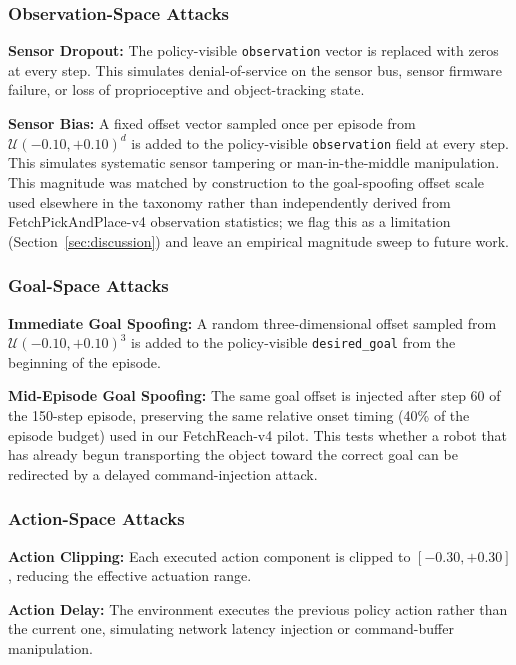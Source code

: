 \documentclass[conference]{IEEEtran}
\begin{document}
\subsubsection{Observation-Space Attacks}

\textbf{Sensor Dropout:} The policy-visible \texttt{observation} vector is replaced
with zeros at every step. This simulates denial-of-service on the sensor bus, sensor
firmware failure, or loss of proprioceptive and object-tracking state.

\textbf{Sensor Bias:} A fixed offset vector sampled once per episode from
$\mathcal{U}(-0.10,+0.10)^d$ is added to the policy-visible \texttt{observation}
field at every step. This simulates systematic sensor tampering or man-in-the-middle
manipulation. This magnitude was matched by construction to the goal-spoofing offset
scale used elsewhere in the taxonomy rather than independently derived from
FetchPickAndPlace-v4 observation statistics; we flag this as a limitation
(Section~\ref{sec:discussion}) and leave an empirical magnitude sweep to future work.

\subsubsection{Goal-Space Attacks}

\textbf{Immediate Goal Spoofing:} A random three-dimensional offset sampled from
$\mathcal{U}(-0.10,+0.10)^3$ is added to the policy-visible
\texttt{desired\_goal} from the beginning of the episode.

\textbf{Mid-Episode Goal Spoofing:} The same goal offset is injected after step 60 of
the 150-step episode, preserving the same relative onset timing (40\% of the episode
budget) used in our FetchReach-v4 pilot. This tests whether a robot that has already
begun transporting the object toward the correct goal can be redirected by a delayed
command-injection attack.

\subsubsection{Action-Space Attacks}

\textbf{Action Clipping:} Each executed action component is clipped to
$[-0.30,+0.30]$, reducing the effective actuation range.

\textbf{Action Delay:} The environment executes the previous policy action rather than
the current one, simulating network latency injection or command-buffer manipulation.
\end{document}
